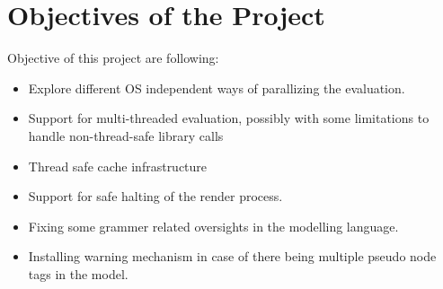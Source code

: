 \section{Objectives of the Project}
Objective of this project are following:
\begin{itemize}
\item Explore different OS independent ways of parallizing the evaluation.
\item Support for multi-threaded evaluation, possibly with some limitations to handle non-thread-safe library calls
\item Thread safe cache infrastructure
\item Support for safe halting of the render process.
\item Fixing some grammer related oversights in the modelling language.
\item Installing warning mechanism in case of there being multiple pseudo node tags in the model.
\end{itemize}
